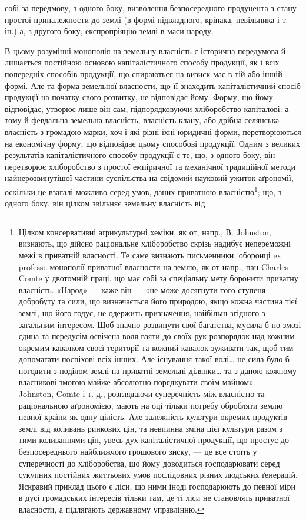 \parcont{}  %
собі за передмову, з одного боку, визволення безпосередного продуцента з стану
простої приналежности до землі (в формі підвладного, кріпака, невільника і т. ін.)
а, з другого боку, експропріяцію землі в маси народу.

В цьому розумінні монополія на земельну власність є історична передумова й
лишається постійною основою капіталістичного способу продукції, як і всіх попередніх
способів продукції, що спираються на визиск мас в тій або іншій
формі. Але та форма земельної власности, що її знаходить капіталістичний
спосіб продукції на початку свого розвитку, не відповідає йому. Форму, що йому
відповідає, утворює лише він сам, підпорядковуючи хліборобство капіталові:
а тому й февдальна земельна власність, власність клану, або дрібна селянська
власність з громадою марки, хоч і які різні їхні юридичні форми,
перетворюються на економічну форму, що відповідає цьому способові продукції.
Одним з великих результатів капіталістичного способу продукції є те, що, з одного
боку, він перетворює хліборобство з простої емпіричної та механічної
традиційної методи найнерозвинутішої частини суспільства на свідомий науковий
ужиток аґрономії, оскільки це взагалі можливо серед умов, даних приватною
власністю\footnote{
Цілком консервативні аґрикультурні хеміки, як от, напр., В. Johnston, визнають, що дійсно
раціональне хліборобство скрізь надибує непереможні межі в приватній власності. Те саме визнають
письменники, оборонці ex professe монополії приватної власности на землю, як от напр., пан Charles
Comte у двотомній праці, що має собі за спеціальну мету боронити приватну власність. «Народ» — каже
він — «не може досягнути того ступеня добробуту та сили, що визначається його природою, якщо
кожна частина тієї землі, що його годує, не одержить призначення, найбільш згідного з загальним
інтересом. Щоб значно розвинути свої багатства, мусила б по змозі єдина та передусім освічена воля
взяти до своїх рук розпорядок над кожним окремим кавалком своєї території та кожний кавалок зуживати
так, щоб тим допомагати поспіхові всіх інших. Але існування такої волі\dots{} не сила було б погодити
з поділом землі на приватні земельні ділянки\dots{} та з даною кожному власникові змогою майже абсолютно
порядкувати своїм майном». — Johnston, Comte і т. д., розглядаючи суперечність між власністю та
раціональною аґрономією, мають на оці тільки потребу обробляти землю певної країни як одну цілість.
Але залежність культури окремих продуктів землі від коливань ринкових цін, та невпинна зміна цієї
культури разом з тими коливаннями цін, увесь дух капіталістичної продукції, що простує до
безпосереднього
найближчого грошового зиску, — це все стоїть у суперечності до хліборобства, що йому
доводиться господарювати серед сукупних постійних життьових умов послідовних різних людських
ґенерацій.
Яскравий приклад цього є ліси, що ними іноді господарюють до певної міри в дусі громадських
інтересів
тільки там, де ті ліси не становлять приватної власности, а підлягають державному управлінню.
}; що, з одного боку, він цілком звільняє земельну власність від
